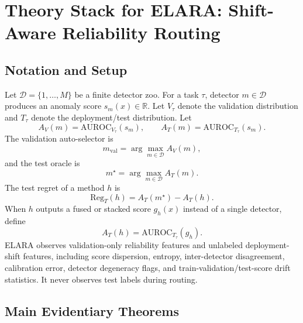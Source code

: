 \section{Theory Stack for ELARA: Shift-Aware Reliability Routing}
\label{sec:theory}

\subsection{Notation and Setup}

Let $\mathcal{D}=\{1,\ldots,M\}$ be a finite detector zoo. For a task $\tau$, detector $m\in\mathcal{D}$ produces an anomaly score $s_m(x)\in \mathbb{R}$. Let $V_\tau$ denote the validation distribution and $T_\tau$ denote the deployment/test distribution. Let
\[
A_V(m)=\mathrm{AUROC}_{V_\tau}(s_m), \qquad
A_T(m)=\mathrm{AUROC}_{T_\tau}(s_m).
\]
The validation auto-selector is
\[
m_{\mathrm{val}} = \arg\max_{m\in\mathcal{D}} A_V(m),
\]
and the test oracle is
\[
m^\star = \arg\max_{m\in\mathcal{D}} A_T(m).
\]
The test regret of a method $h$ is
\[
\mathrm{Reg}_T(h)=A_T(m^\star)-A_T(h).
\]
When $h$ outputs a fused or stacked score $g_h(x)$ instead of a single detector, define
\[
A_T(h)=\mathrm{AUROC}_{T_\tau}(g_h).
\]
ELARA observes validation-only reliability features and unlabeled deployment-shift features, including score dispersion, entropy, inter-detector disagreement, calibration error, detector degeneracy flags, and train-validation/test-score drift statistics. It never observes test labels during routing.

\subsection{Main Evidentiary Theorems}

